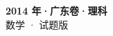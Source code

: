 \documentclass[zihao=-4, a4paper]{ctexart}
\begin{document}
\begin{center}
  {\Large\bfseries 2014 年·广东卷·理科}\\[4pt]
  {\large 数学 · 试题版}
\end{center}
\medskip
{}

\end{document}
